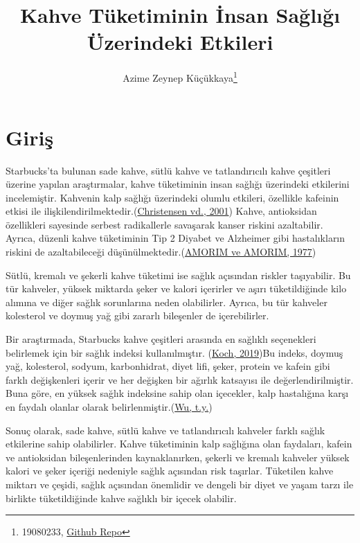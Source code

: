 \documentclass[
  12pt,
]{article}
\title{Kahve Tüketiminin İnsan Sağlığı Üzerindeki Etkileri}
\author{Azime Zeynep Küçükkaya\footnote{19080233, \href{https://github.com/azimezeynepkucukkaya/istatistik_arasinav.git}{Github Repo}}}
\date{}
\begin{document}
\maketitle

\hypertarget{giriux15f}{%
\section{Giriş}\label{giriux15f}}

Starbucks'ta bulunan sade kahve, sütlü kahve ve tatlandırıcılı kahve çeşitleri üzerine yapılan araştırmalar, kahve tüketiminin insan sağlığı üzerindeki etkilerini incelemiştir. Kahvenin kalp sağlığı üzerindeki olumlu etkileri, özellikle kafeinin etkisi ile ilişkilendirilmektedir.(\protect\hyperlink{ref-christensen2001abstention}{Christensen vd., 2001}) Kahve, antioksidan özellikleri sayesinde serbest radikallerle savaşarak kanser riskini azaltabilir. Ayrıca, düzenli kahve tüketiminin Tip 2 Diyabet ve Alzheimer gibi hastalıkların riskini de azaltabileceği düşünülmektedir.(\protect\hyperlink{ref-amorim1977coffee}{AMORIM ve AMORIM, 1977})

Sütlü, kremalı ve şekerli kahve tüketimi ise sağlık açısından riskler taşıyabilir. Bu tür kahveler, yüksek miktarda şeker ve kalori içerirler ve aşırı tüketildiğinde kilo alımına ve diğer sağlık sorunlarına neden olabilirler. Ayrıca, bu tür kahveler kolesterol ve doymuş yağ gibi zararlı bileşenler de içerebilirler.

Bir araştırmada, Starbucks kahve çeşitleri arasında en sağlıklı seçenekleri belirlemek için bir sağlık indeksi kullanılmıştır. (\protect\hyperlink{ref-koch2019starbucks}{Koch, 2019})Bu indeks, doymuş yağ, kolesterol, sodyum, karbonhidrat, diyet lifi, şeker, protein ve kafein gibi farklı değişkenleri içerir ve her değişken bir ağırlık katsayısı ile değerlendirilmiştir. Buna göre, en yüksek sağlık indeksine sahip olan içecekler, kalp hastalığına karşı en faydalı olanlar olarak belirlenmiştir.(\protect\hyperlink{ref-wustarbucks}{Wu, t.y.})

Sonuç olarak, sade kahve, sütlü kahve ve tatlandırıcılı kahveler farklı sağlık etkilerine sahip olabilirler. Kahve tüketiminin kalp sağlığına olan faydaları, kafein ve antioksidan bileşenlerinden kaynaklanırken, şekerli ve kremalı kahveler yüksek kalori ve şeker içeriği nedeniyle sağlık açısından risk taşırlar. Tüketilen kahve miktarı ve çeşidi, sağlık açısından önemlidir ve dengeli bir diyet ve yaşam tarzı ile birlikte tüketildiğinde kahve sağlıklı bir içecek olabilir.
\end{document}

